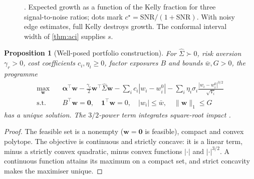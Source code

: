 \documentclass{article}
\theoremstyle{plain}
\newtheorem{proposition}[theorem]{Proposition}
\theoremstyle{definition}
\theoremstyle{remark}
\newcommand{\w}{\bm{w}}
\begin{document}
\begin{figure}[ht]
\centering
{}
\caption{. Expected growth as a function of the Kelly fraction for three signal-to-noise ratios; dots mark $c^\star=\mathrm{SNR}/(1+\mathrm{SNR})$. With noisy edge estimates, full Kelly destroys growth. The conformal interval width of \cref{thm:aci} supplies $s$.}
\label{fig:kelly}
\end{figure}

\begin{proposition}[Well-posed portfolio construction]\label{prop:convex}
For $\hat\Sigma\succ0$, risk aversion $\gamma_r>0$, cost coefficients $c_i,\eta_i\ge0$, factor exposures $B$ and bounds $\bar w,G>0$, the programme
\begin{align*}
  \max_{\w}\quad & \bm\alpha^\top\w-\tfrac{\gamma_r}{2}\w^\top\hat\Sigma\w-\sum_ic_i|w_i-w_i^0|-\sum_i\eta_i\sigma_i\frac{|w_i-w_i^0|^{3/2}}{\sqrt{V_i}}\\
  \text{s.t.}\quad & B^\top\w=\bm 0,\quad \bm 1^\top\w=0,\quad |w_i|\le\bar w,\quad \|\w\|_1\le G
\end{align*}
has a unique solution. The $3/2$-power term integrates square-root impact \citep{bouchaud2018}.
\end{proposition}
\begin{proof}
The feasible set is a nonempty ($\w=\bm 0$ is feasible), compact and convex polytope. The objective is continuous and strictly concave: it is a linear term, minus a strictly convex quadratic, minus convex functions $|\cdot|$ and $|\cdot|^{3/2}$. A continuous function attains its maximum on a compact set, and strict concavity makes the maximiser unique.
\end{proof}
\end{document}
